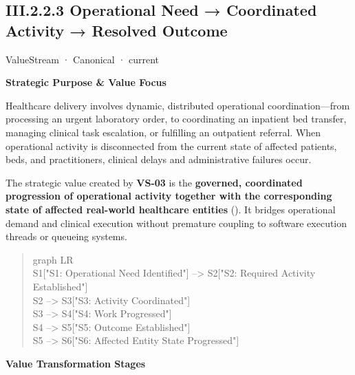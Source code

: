 \subsection*{III.2.2.3 Operational Need → Coordinated Activity → Resolved Outcome}
\label{navigation:III.2.2.3}

\label{element:beea615ca7b34bbcbd0ad3a2a6ab2cff}
{\small ValueStream · Canonical · current}\par

\par\medskip\textbf{Strategic Purpose \& Value Focus}\par


Healthcare delivery involves dynamic, distributed operational coordination—from processing an urgent laboratory order, to coordinating an inpatient bed transfer, managing clinical task escalation, or fulfilling an outpatient referral. When operational activity is disconnected from the current state of affected patients, beds, and practitioners, clinical delays and administrative failures occur.



The strategic value created by \textbf{VS-03} is the \textbf{governed, coordinated progression of operational activity together with the corresponding state of affected real-world healthcare entities} (\texttt{}). It bridges operational demand and clinical execution without premature coupling to software execution threads or queueing systems.



\begin{quote}\small\ttfamily
graph LR\\
    S1["S1: Operational Need Identified"] --> S2["S2: Required Activity Established"]\\
    S2 --> S3["S3: Activity Coordinated"]\\
    S3 --> S4["S4: Work Progressed"]\\
    S4 --> S5["S5: Outcome Established"]\\
    S5 --> S6["S6: Affected Entity State Progressed"]\\

\end{quote}


\par\medskip\textbf{Value Transformation Stages}\par


